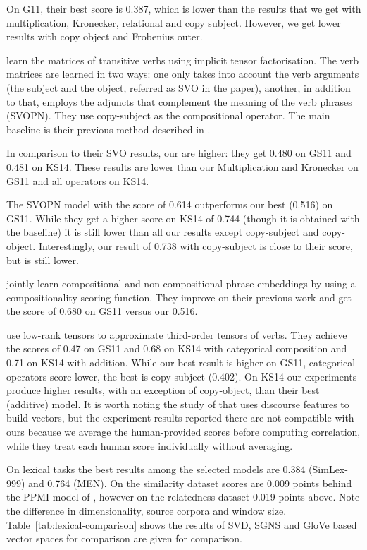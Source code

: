 On G11, their best score is 0.387, which is lower than the results that we get with multiplication, Kronecker, relational and copy subject. However, we get lower results with copy object and Frobenius outer.

 learn the matrices of transitive verbs using implicit tensor factorisation. The verb matrices are learned in two ways: one only takes into account the verb arguments (the subject and the object, referred as SVO in the paper), another, in addition to that, employs the adjuncts that complement the meaning of the verb phrases (SVOPN). They use copy-subject as the compositional operator. The main baseline is their previous method described in .

In comparison to their SVO results, our are higher: they get 0.480 on GS11 and 0.481 on KS14. These results are lower than our Multiplication and Kronecker on GS11 and all operators on KS14.

The SVOPN model with the score of 0.614 outperforms our best (0.516) on GS11. While they get a higher score on KS14 of 0.744 (though it is obtained with the  baseline) it is still lower than all our results except copy-subject and copy-object. Interestingly, our result of 0.738 with copy-subject is close to their score, but is still lower.

 jointly learn compositional and non-compositional phrase embeddings by using a compositionality scoring function. They improve on their previous work and get the score of 0.680 on GS11 versus our 0.516.

 use low-rank tensors to approximate third-order tensors of verbs. They achieve the scores of 0.47 on GS11 and 0.68 on KS14 with categorical composition and 0.71 on KS14 with addition. While our best result is higher on GS11, categorical operators score lower, the best is copy-subject (0.402). On KS14 our experiments produce higher results, with an exception of copy-object, than their best (additive) model. It is worth noting the study of  that uses discourse features to build vectors, but the experiment results reported there are not compatible with ours because we average the human-provided scores before computing correlation, while they treat each human score individually without averaging.


On lexical tasks the best results among the selected models are 0.384 (SimLex-999) and 0.764 (MEN). On the similarity dataset scores are 0.009 points behind the PPMI model of , however on the relatedness dataset 0.019 points above. Note the difference in dimensionality, source corpora and window size. Table~\ref{tab:lexical-comparison} shows the results of SVD, SGNS and GloVe based vector spaces for comparison are given for comparison.

